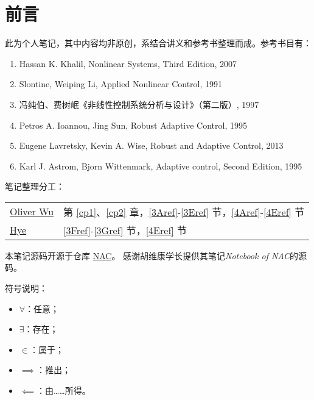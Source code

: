 \chapter*{前言}
此为个人笔记，其中内容均非原创，系结合讲义和参考书整理而成。参考书目有：
\begin{enumerate}
    \item Hassan K. Khalil, Nonlinear Systems, Third Edition, 2007
    \item Slontine, Weiping Li, Applied   Nonlinear    Control, 1991
    \item 冯纯伯、费树岷《非线性控制系统分析与设计》（第二版）, 1997
    \item Petros A. Ioannou, Jing Sun, Robust Adaptive Control, 1995
    \item Eugene Lavretsky, Kevin A. Wise, Robust and Adaptive Control, 2013
    \item Karl J. Astrom, Bjorn Wittenmark, Adaptive control, Second Edition, 1995
\end{enumerate}

笔记整理分工：
\begin{table*}[htbp]
  \centering
  \setcellgapes{4pt}
  \makegapedcells
  \begin{tabular}{p{3.0cm}p{9.0cm}}
    \hline
    \href{https://github.com/OliverWu515}{Oliver Wu} & 第 \ref{cp1}、\ref{cp2} 章，\ref{3Aref}-\ref{3Eref} 节，\ref{4Aref}-\ref{4Eref} 节\\
    \href{https://github.com/Co-ding-Man}{Hye} & \ref{3Fref}-\ref{3Gref} 节，\ref{4Eref} 节\\
    \hline
  \end{tabular}
\end{table*}

本笔记源码开源于仓库 \href{https://github.com/OliverWu515/NAC}{NAC}。
感谢胡维康学长提供其笔记{\it Notebook of NAC}的源码。

符号说明：
\begin{itemize}
    \item $\forall$：任意；
    \item $\exists$：存在；
    \item $\in$：属于；
    \item $\implies$：推出；
    \item $\impliedby$：由……所得。
\end{itemize}
